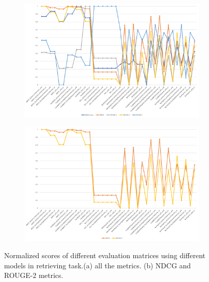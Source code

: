\documentclass[10pt,a4paper,fleqn]{report}
\begin{document}
			\begin{figure}[htbp]
				\centering
				\begin{subfigure}[b]{1\textwidth}
					\centering
					\includegraphics[width=\textwidth]{figure/partB_normalized_evaluation_metrics.png}
					\caption{}
					\label{fig: partbnormalizedevaluationmetrics_all}
				\end{subfigure}
				\hfill
				\begin{subfigure}[b]{1\textwidth}
					\centering
					\includegraphics[width=\textwidth]{figure/partB_normalized_evaluation_metrics_part.png}
					\caption{}
					\label{fig: partbnormalizedevaluationmetrics_part}
				\end{subfigure}
				\hfill
				\caption[]{Normalized scores of different evaluation matrices using different models in retrieving task.(a) all the metrics. (b) NDCG and ROUGE-2 metrics.}
				\label{fig: partB_normalized_evaluation_metrics}
			\end{figure}
			
\end{document}
